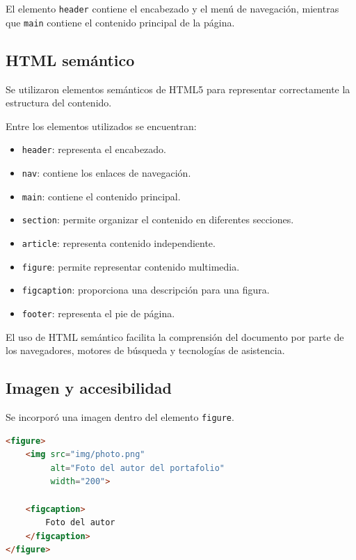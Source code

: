 \documentclass{article}
\begin{document}
El elemento \texttt{header} contiene el encabezado y el menú de
navegación, mientras que \texttt{main} contiene el contenido
principal de la página.

\subsection{HTML semántico}

Se utilizaron elementos semánticos de HTML5 para representar
correctamente la estructura del contenido.

Entre los elementos utilizados se encuentran:

\begin{itemize}

    \item \texttt{header}: representa el encabezado.

    \item \texttt{nav}: contiene los enlaces de navegación.

    \item \texttt{main}: contiene el contenido principal.

    \item \texttt{section}: permite organizar el contenido
    en diferentes secciones.

    \item \texttt{article}: representa contenido independiente.

    \item \texttt{figure}: permite representar contenido
    multimedia.

    \item \texttt{figcaption}: proporciona una descripción
    para una figura.

    \item \texttt{footer}: representa el pie de página.

\end{itemize}

El uso de HTML semántico facilita la comprensión del documento
por parte de los navegadores, motores de búsqueda y tecnologías
de asistencia.

\subsection{Imagen y accesibilidad}

Se incorporó una imagen dentro del elemento
\texttt{figure}.

\begin{lstlisting}[language=HTML]
<figure>
    <img src="img/photo.png"
         alt="Foto del autor del portafolio"
         width="200">

    <figcaption>
        Foto del autor
    </figcaption>
</figure>
\end{lstlisting}
\end{document}
